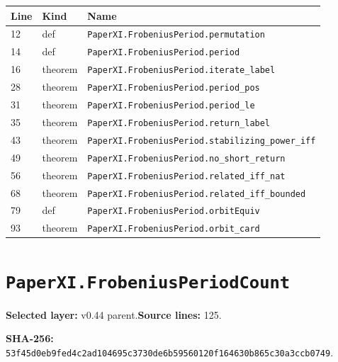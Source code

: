 \documentclass[10pt,oneside]{book}
\begin{document}
\begin{longtable}{@{}p{}p{}p{}@{}}\toprule Line&Kind&Name\\\midrule\endhead

12&def&\nolinkurl{PaperXI.FrobeniusPeriod.permutation}\\

14&def&\nolinkurl{PaperXI.FrobeniusPeriod.period}\\

16&theorem&\nolinkurl{PaperXI.FrobeniusPeriod.iterate_label}\\

28&theorem&\nolinkurl{PaperXI.FrobeniusPeriod.period_pos}\\

31&theorem&\nolinkurl{PaperXI.FrobeniusPeriod.period_le}\\

35&theorem&\nolinkurl{PaperXI.FrobeniusPeriod.return_label}\\

43&theorem&\nolinkurl{PaperXI.FrobeniusPeriod.stabilizing_power_iff}\\

49&theorem&\nolinkurl{PaperXI.FrobeniusPeriod.no_short_return}\\

56&theorem&\nolinkurl{PaperXI.FrobeniusPeriod.related_iff_nat}\\

68&theorem&\nolinkurl{PaperXI.FrobeniusPeriod.related_iff_bounded}\\

79&def&\nolinkurl{PaperXI.FrobeniusPeriod.orbitEquiv}\\

93&theorem&\nolinkurl{PaperXI.FrobeniusPeriod.orbit_card}\\

\bottomrule\end{longtable}

\section{\texorpdfstring{\nolinkurl{PaperXI.FrobeniusPeriodCount}}{PaperXI.FrobeniusPeriodCount}}\label{module:PaperXI.FrobeniusPeriodCount}

\textbf{Selected layer:} v0.44 parent.\quad\textbf{Source lines:} 125.\par\textbf{SHA-256:} {\scriptsize\nolinkurl{53f45d0eb9fed4c2ad104695c3730de6b59560120f164630b865c30a3ccb0749}}.
\end{document}
